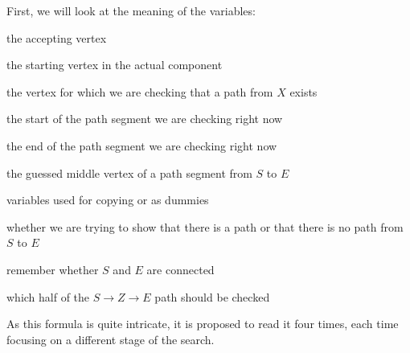 First, we will look at the meaning of the variables:
\begin{description}
    \setlength\itemsep{0.2em}
    \item[$Y$:] the accepting vertex
    \item[$X$:] the starting vertex in the actual component
    \item[$I$:] the vertex for which we are checking that a path from $X$ exists
    \item[$S$:] the start of the path segment we are checking right now
    \item[$E$:] the end of the path segment we are checking right now
    \item[$Z, Z_{e}$:] the guessed middle vertex of a path segment from $S$ to $E$
    \item[$A, B, b_{0}$:] variables used for copying or as dummies
    \item[$b_{path}$:] whether we are trying to show that there is a path or that there is no path from $S$ to $E$
    \item[$b_{1}$:] remember whether $S$ and $E$ are connected
    \item[$b_{2}, b_{2e}$:] which half of the $S \to Z \to E$ path should be checked
\end{description}
As this formula is quite intricate, it is proposed to read it four times, each time focusing on a different stage of the search.
